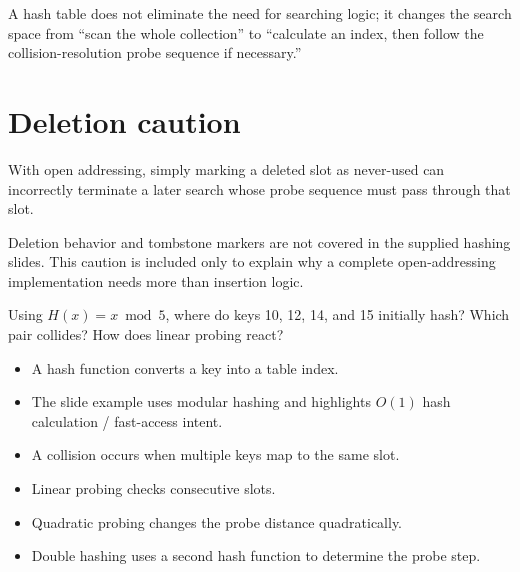 \begin{keyidea}
A hash table does not eliminate the need for searching logic; it changes the search space from ``scan the whole collection'' to ``calculate an index, then follow the collision-resolution probe sequence if necessary.''
\end{keyidea}

\section{Deletion caution}

With open addressing, simply marking a deleted slot as never-used can incorrectly terminate a later search whose probe sequence must pass through that slot.

\begin{clarification}
Deletion behavior and tombstone markers are not covered in the supplied hashing slides. This caution is included only to explain why a complete open-addressing implementation needs more than insertion logic.
\end{clarification}

\begin{quickcheck}
Using $H(x)=x\bmod5$, where do keys 10, 12, 14, and 15 initially hash? Which pair collides? How does linear probing react?
\end{quickcheck}

\begin{chapterrecap}
\begin{itemize}
  \item A hash function converts a key into a table index.
  \item The slide example uses modular hashing and highlights $O(1)$ hash calculation / fast-access intent.
  \item A collision occurs when multiple keys map to the same slot.
  \item Linear probing checks consecutive slots.
  \item Quadratic probing changes the probe distance quadratically.
  \item Double hashing uses a second hash function to determine the probe step.
\end{itemize}
\end{chapterrecap}


